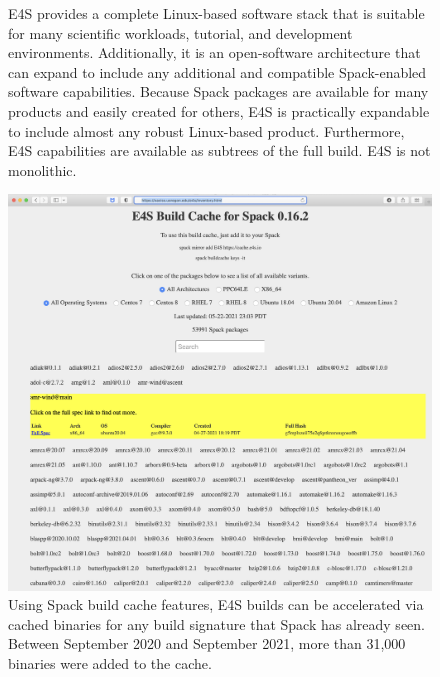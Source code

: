 \begin{figure}
	\centering
	\caption{E4S provides a complete Linux-based software stack that is suitable for many scientific workloads, tutorial, and development environments.  Additionally, it is an open-software architecture that can expand to include any additional and compatible Spack-enabled software capabilities. Because Spack packages are available for many products and easily created for others, E4S is practically expandable to include almost any robust Linux-based product.  Furthermore, E4S capabilities are available as subtrees of the full build. E4S is not monolithic.}
    \protect{}
	\label{fig:e4s-is-isnot}
\end{figure}

\begin{figure}
	\centering
	\includegraphics[width=0.9\linewidth]{projects/2.3.5-Ecosystem/2.3.5.01-Ecosystem-SDK/E4S_buildcache_Oct21}
	\caption{Using Spack build cache features, E4S builds can be accelerated via cached binaries for any build signature that Spack has already seen. Between September 2020 and September 2021, more than 31,000 binaries were added to the cache.}
	\label{fig:e4s-build-cache}
\end{figure}

